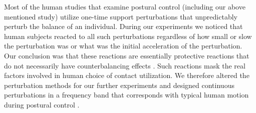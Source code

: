 Most of the human studies that examine postural control \cite{Horak1986, Henry1998, Dimitrova2004} (including our above mentioned study) utilize one-time support perturbations that unpredictably perturb the balance of an individual. During our experiments we noticed that human subjects reacted to all such perturbations regardless of how small or slow the perturbation was or what was the initial acceleration of the perturbation. Our conclusion was that these reactions are essentially protective reactions that do not necessarily have counterbalancing effects \cite{McIlroy1995, Corbeil2013}. Such reactions mask the real factors involved in human choice of contact utilization. We therefore altered the perturbation methods for our further experiments and designed continuous perturbations in a frequency band that corresponds with typical human motion during postural control \cite{Nawayseh2006}.


